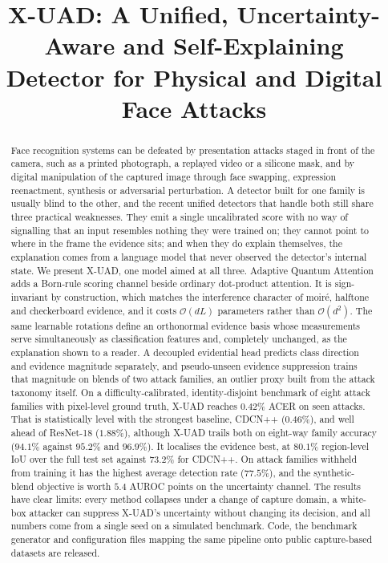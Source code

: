 \documentclass[conference]{IEEEtran}
\begin{document}
\title{X-UAD: A Unified, Uncertainty-Aware and Self-Explaining Detector for
Physical and Digital Face Attacks}

\author{}

\maketitle

\begin{abstract}
Face recognition systems can be defeated by presentation attacks staged in front
of the camera, such as a printed photograph, a replayed video or a silicone mask,
and by digital manipulation of the captured image through face swapping,
expression reenactment, synthesis or adversarial perturbation. A detector built for
one family is usually blind to the other, and the recent unified detectors that
handle both still share three practical weaknesses. They emit a single uncalibrated
score with no way of signalling that an input resembles nothing they were trained
on; they cannot point to where in the frame the evidence sits; and when they do
explain themselves, the explanation comes from a language model that never observed
the detector's internal state. We present X-UAD, one model aimed at all three.
Adaptive Quantum Attention adds a Born-rule scoring channel beside ordinary
dot-product attention. It is sign-invariant by construction, which matches the
interference character of moir\'e, halftone and checkerboard evidence, and it costs
$\mathcal{O}(dL)$ parameters rather than $\mathcal{O}(d^{2})$. The same learnable
rotations define an orthonormal evidence basis whose measurements serve
simultaneously as classification features and, completely unchanged, as the
explanation shown to a reader. A decoupled evidential head predicts class direction
and evidence magnitude separately, and pseudo-unseen evidence suppression trains
that magnitude on blends of two attack families, an outlier proxy built from the
attack taxonomy itself. On a difficulty-calibrated, identity-disjoint benchmark of
eight attack families with pixel-level ground truth, X-UAD reaches $0.42\%$ ACER on
seen attacks. That is statistically level with the strongest baseline, CDCN++
($0.46\%$), and well ahead of ResNet-18 ($1.88\%$), although X-UAD trails both on
eight-way family accuracy ($94.1\%$ against $95.2\%$ and $96.9\%$). It localises the
evidence best, at $80.1\%$ region-level IoU over the full test set against $73.2\%$ for CDCN++. On attack
families withheld from training it has the highest average detection rate
($77.5\%$), and the synthetic-blend objective is worth $5.4$ AUROC points on the
uncertainty channel. The results have clear limits: every method collapses under a
change of capture domain, a white-box attacker can suppress X-UAD's uncertainty
without changing its decision, and all numbers come from a single seed on a
simulated benchmark. Code, the benchmark generator and configuration files mapping
the same pipeline onto public capture-based datasets are released.
\end{abstract}
\end{document}
